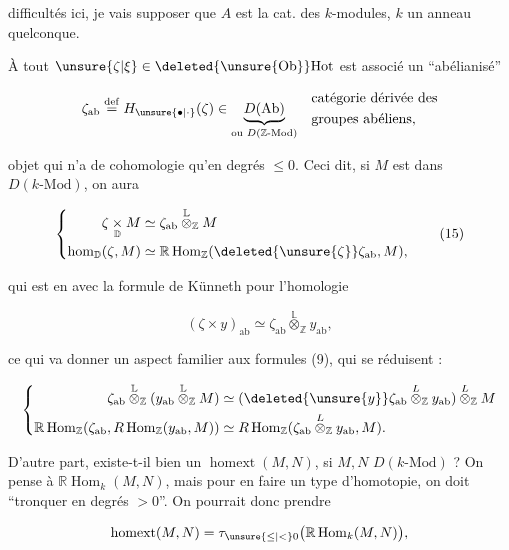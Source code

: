 difficultés  ici, je vais supposer que $A$ est la cat. des $k$-modules, $k$ un anneau quelconque.

À tout $\unsure{\zeta|\xi}\in\deleted{\unsure{\mathrm{Ob}}}\mathrm{Hot}$ est associé un ``abélianisé''

\[
\zeta_{\mathrm{ab}}\overset{\mathrm{def}}{=}H_{\unsure{\bullet|\cdot}}(\zeta)\in
\underset{\text{ou }D(\mathbb Z\text{-}\mathrm{Mod})}{\underbrace{D(\mathrm{Ab})}}
\quad\begin{aligned}&\text{catégorie dérivée des}\\&\text{groupes abéliens,}\end{aligned}
\]

objet qui n'a de cohomologie qu'en degrés $\leq 0$. Ceci dit, si $M$ est dans $D(k\text{-}\mathrm{Mod})$, on aura

\[
\left\{\begin{aligned}
\zeta\mathbin{\underset{\mathbb D}{\times}}M&\simeq\zeta_{\mathrm{ab}}\overset{\mathbb L}{\otimes}_{\mathbb Z}M\\
\operatorname{hom}_{\mathbb D}(\zeta,M)&\simeq\mathbb R\operatorname{Hom}_{\mathbb Z}(\deleted{\unsure{\zeta}}\zeta_{\mathrm{ab}},M),
\end{aligned}\right.
\tag*{(15)}
\]

 qui est en  avec la formule de Künneth pour l'homologie

\[
(\zeta\times y)_{\mathrm{ab}}\simeq\zeta_{\mathrm{ab}}\overset{\mathbb L}{\otimes}_{\mathbb Z}y_{\mathrm{ab}},
\tag*{(16)}
\]

ce qui va donner un aspect familier aux formules (9), qui se réduisent :

\[
\left\{\begin{aligned}
\zeta_{\mathrm{ab}}\overset{\mathbb L}{\otimes}_{\mathbb Z}
(y_{\mathrm{ab}}\overset{\mathbb L}{\otimes}_{\mathbb Z}M)
&\simeq(\deleted{\unsure{y}}\zeta_{\mathrm{ab}}\overset{L}{\otimes}_{\mathbb Z}y_{\mathrm{ab}})\overset{L}{\otimes}_{\mathbb Z}M\\
\mathbb R\operatorname{Hom}_{\mathbb Z}(\zeta_{\mathrm{ab}},R\operatorname{Hom}_{\mathbb Z}(y_{\mathrm{ab}},M))
&\simeq R\operatorname{Hom}_{\mathbb Z}(\zeta_{\mathrm{ab}}\overset{L}{\otimes}_{\mathbb Z}y_{\mathrm{ab}},M).
\end{aligned}\right.
\]


D'autre part, existe-t-il bien un $\operatorname{homext}(M,N)$, si $M,N$  $D(k\text{-}\mathrm{Mod})$ ? On pense à $\mathbb R\operatorname{Hom}_k(M,N)$, mais pour en faire un type d'homotopie, on doit ``tronquer en degrés $>0$''. On pourrait donc prendre

\[
\operatorname{homext}(M,N)=\tau_{\unsure{\leq|<}0}\bigl(\mathbb R\operatorname{Hom}_k(M,N)\bigr),
\]
